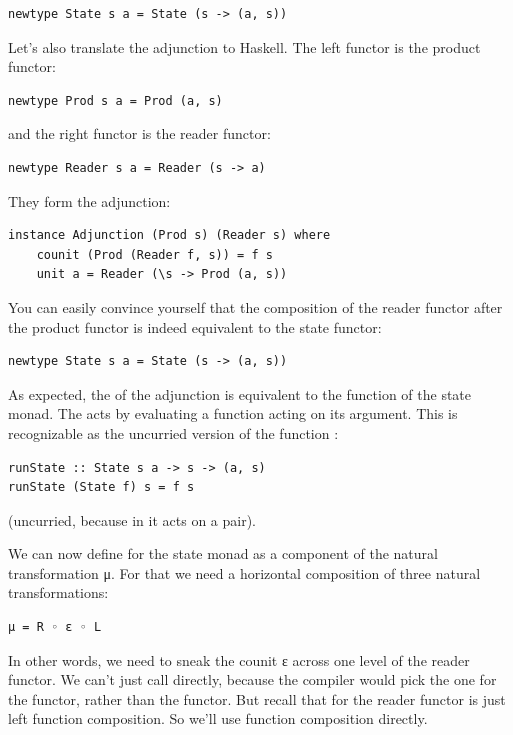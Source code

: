 \begin{Verbatim}[commandchars=\\\{\}]
newtype State s a = State (s -> (a, s))
\end{Verbatim}
Let's also translate the adjunction to Haskell. The left functor is the
product functor:

\begin{Verbatim}[commandchars=\\\{\}]
newtype Prod s a = Prod (a, s)
\end{Verbatim}
and the right functor is the reader functor:

\begin{Verbatim}[commandchars=\\\{\}]
newtype Reader s a = Reader (s -> a)
\end{Verbatim}
They form the adjunction:

\begin{Verbatim}
instance Adjunction (Prod s) (Reader s) where
    counit (Prod (Reader f, s)) = f s
    unit a = Reader (\s -> Prod (a, s))
\end{Verbatim}
You can easily convince yourself that the composition of the reader
functor after the product functor is indeed equivalent to the state
functor:

\begin{Verbatim}[commandchars=\\\{\}]
newtype State s a = State (s -> (a, s))
\end{Verbatim}
As expected, the  of the adjunction is equivalent to the
 function of the state monad. The  acts by
evaluating a function acting on its argument. This is recognizable as
the uncurried version of the function :

\begin{Verbatim}[commandchars=\\\{\}]
runState :: State s a -> s -> (a, s)
runState (State f) s = f s
\end{Verbatim}
(uncurried, because in  it acts on a pair).

We can now define  for the state monad as a component of
the natural transformation μ. For that we need a horizontal composition
of three natural transformations:

\begin{Verbatim}[commandchars=\\\{\}]
μ = R ◦ ε ◦ L
\end{Verbatim}
In other words, we need to sneak the counit ε across one level of the
reader functor. We can't just call  directly, because the
compiler would pick the one for the  functor, rather than
the  functor. But recall that  for the
reader functor is just left function composition. So we'll use function
composition directly.

